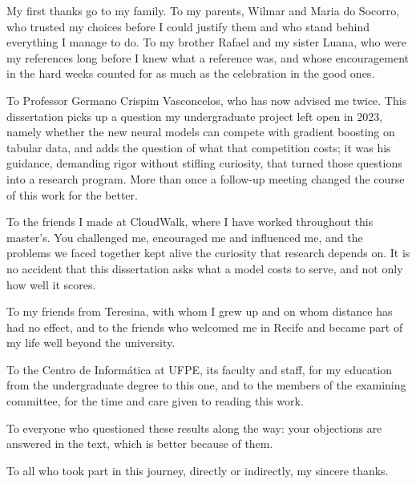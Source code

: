 My first thanks go to my family. To my parents, Wilmar and Maria do
Socorro, who trusted my choices before I could justify them and who
stand behind everything I manage to do. To my brother Rafael and my
sister Luana, who were my references long before I knew what a
reference was, and whose encouragement in the hard weeks counted for
as much as the celebration in the good ones.

To Professor Germano Crispim Vasconcelos, who has now advised me
twice. This dissertation picks up a question my undergraduate project
left open in 2023, namely whether the new neural models can compete with
gradient boosting on tabular data, and adds the question of what
that competition costs; it was his guidance, demanding rigor without
stifling curiosity, that turned those questions into a research
program. More than once a follow-up meeting changed the course of
this work for the better.

To the friends I made at CloudWalk, where I have worked throughout
this master's. You challenged me, encouraged me and influenced me,
and the problems we faced together kept alive the curiosity that
research depends on. It is no accident that this dissertation asks
what a model costs to serve, and not only how well it scores.

To my friends from Teresina, with whom I grew up and on whom distance
has had no effect, and to the friends who welcomed me in Recife and
became part of my life well beyond the university.

To the Centro de Inform\'atica at UFPE, its faculty and staff, for my
education from the undergraduate degree to this one, and to the
members of the examining committee, for the time and care given to
reading this work.

To everyone who questioned these results along the way: your
objections are answered in the text, which is better because of them.

To all who took part in this journey, directly or indirectly, my
sincere thanks.
